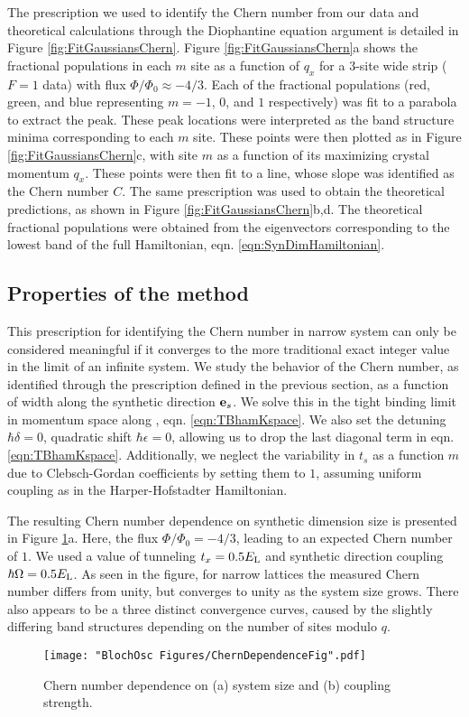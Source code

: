 The prescription we used to identify the Chern number from our data and theoretical calculations through the Diophantine equation argument is detailed in Figure \ref{fig:FitGaussiansChern}. Figure \ref{fig:FitGaussiansChern}a shows the fractional populations in each $m$ site as a function of $q_x$ for a $3$-site wide strip ($F=1$ data) with flux $\Phi/\Phi_0\approx-4/3$. Each of the fractional populations (red, green, and blue representing $m=-1$, $0$, and $1$ respectively) was fit to a parabola to extract the peak. These peak locations were interpreted as the band structure minima corresponding to each $m$ site. These points were then plotted as in Figure \ref{fig:FitGaussiansChern}c, with site $m$ as a function of its maximizing crystal momentum $q_x$. These points were then fit to a line, whose slope was identified as the Chern number $C$. The same prescription was used to obtain the theoretical predictions, as shown in Figure \ref{fig:FitGaussiansChern}b,d. The theoretical fractional populations were obtained from the eigenvectors corresponding to the lowest band of the full Hamiltonian, eqn. \ref{eqn:SynDimHamiltonian}. 

\subsection{Properties of the method}

This prescription for identifying the Chern number in narrow system can only be considered meaningful if it converges to the more traditional exact integer value in the limit of an infinite system. We study the behavior of the Chern number, as identified through the prescription defined in the previous section, as a function of width along the synthetic direction $\textbf{e}_s{}$. We solve this in the tight binding limit in momentum space along \ex{}, eqn. \ref{eqn:TBhamKspace}. We also set the detuning $\hbar\delta=0$, quadratic shift $\hbar\epsilon=0$, allowing us to drop the last diagonal term in eqn. \ref{eqn:TBhamKspace}. Additionally, we neglect the variability in $t_s$ as a function $m$ due to Clebsch-Gordan coefficients by setting them to $1$, assuming uniform coupling as in the Harper-Hofstadter Hamiltonian.

The resulting Chern number dependence on synthetic dimension size is presented in Figure \ref{fig:ChernDependenceFig}a. Here, the flux $\Phi/\Phi_0 = - 4/3$, leading to an expected Chern number of $1$. We used a value of tunneling $t_x = 0.5 E_{\rm L}$ and synthetic direction coupling $\hbar\Omega = 0.5 E_{\rm L}$. As seen in the figure, for narrow lattices the measured Chern number differs from unity, but converges to unity as the system size grows. There also appears to be a three distinct convergence curves, caused by the slightly differing band structures depending on the number of sites modulo $q$. 
\begin{figure}
\texttt{[image: "BlochOsc Figures/ChernDependenceFig".pdf]}
\caption[Chern number dependence] {Chern number dependence on (a) system size and (b) coupling strength.}
\label{fig:ChernDependenceFig}
\end{figure}

